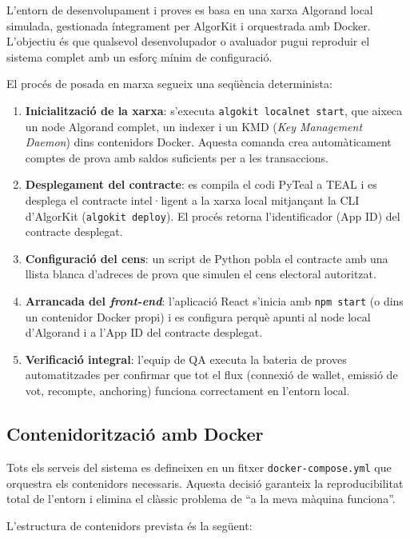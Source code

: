 L'entorn de desenvolupament i proves es basa en una xarxa Algorand local simulada, gestionada íntegrament per AlgorKit i orquestrada amb Docker. L'objectiu és que qualsevol desenvolupador o avaluador pugui reproduir el sistema complet amb un esforç mínim de configuració.
 
El procés de posada en marxa segueix una seqüència determinista:
 
\begin{enumerate}[label=\roman*.]
    \item \textbf{Inicialització de la xarxa}: s'executa \texttt{algokit localnet start}, que aixeca un node Algorand complet, un indexer i un KMD (\textit{Key Management Daemon}) dins contenidors Docker. Aquesta comanda crea automàticament comptes de prova amb saldos suficients per a les transaccions.
    \item \textbf{Desplegament del contracte}: es compila el codi PyTeal a TEAL i es desplega el contracte intel·ligent a la xarxa local mitjançant la CLI d'AlgorKit (\texttt{algokit deploy}). El procés retorna l'identificador (App ID) del contracte desplegat.
    \item \textbf{Configuració del cens}: un script de Python pobla el contracte amb una llista blanca d'adreces de prova que simulen el cens electoral autoritzat.
    \item \textbf{Arrancada del \textit{front-end}}: l'aplicació React s'inicia amb \texttt{npm start} (o dins un contenidor Docker propi) i es configura perquè apunti al node local d'Algorand i a l'App ID del contracte desplegat.
    \item \textbf{Verificació integral}: l'equip de QA executa la bateria de proves automatitzades per confirmar que tot el flux (connexió de wallet, emissió de vot, recompte, anchoring) funciona correctament en l'entorn local.
\end{enumerate}
 
\subsection{Contenidorització amb Docker}
 
Tots els serveis del sistema es defineixen en un fitxer \texttt{docker-compose.yml} que orquestra els contenidors necessaris. Aquesta decisió garanteix la reproducibilitat total de l'entorn i elimina el clàssic problema de ``a la meva màquina funciona''.
 
L'estructura de contenidors prevista és la següent:
 
